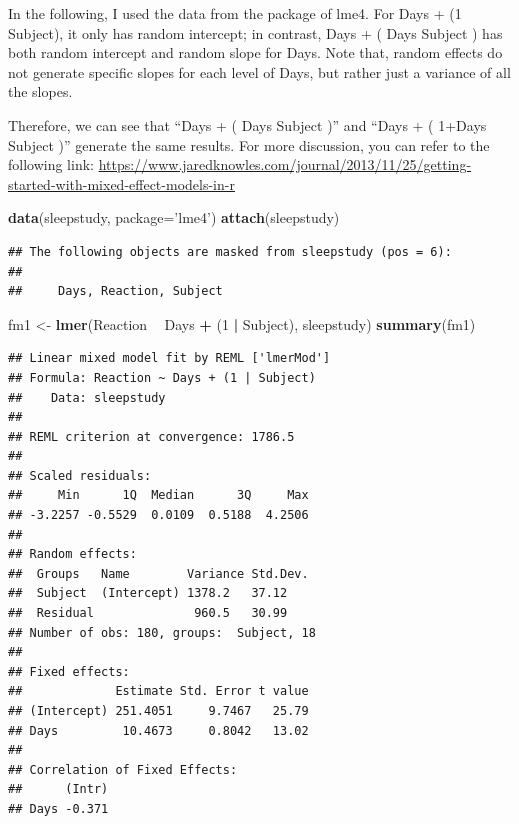 \documentclass[]{book}
\newenvironment{Shaded}{\begin{snugshade}}{\end{snugshade}}
\newcommand{\DataTypeTok}[1]{\textcolor[rgb]{0.13,0.29,0.53}{#1}}
\newcommand{\DecValTok}[1]{\textcolor[rgb]{0.00,0.00,0.81}{#1}}
\newcommand{\KeywordTok}[1]{\textcolor[rgb]{0.13,0.29,0.53}{\textbf{#1}}}
\newcommand{\NormalTok}[1]{#1}
\newcommand{\OperatorTok}[1]{\textcolor[rgb]{0.81,0.36,0.00}{\textbf{#1}}}
\newcommand{\StringTok}[1]{\textcolor[rgb]{0.31,0.60,0.02}{#1}}
\begin{document}
In the following, I used the data from the package of lme4. For Days + (1 \textbar{} Subject), it only has random intercept; in contrast, Days + ( Days\textbar{} Subject ) has both random intercept and random slope for Days. Note that, random effects do not generate specific slopes for each level of Days, but rather just a variance of all the slopes.

Therefore, we can see that ``Days + ( Days\textbar{} Subject )'' and ``Days + ( 1+Days\textbar{} Subject )'' generate the same results. For more discussion, you can refer to the following link: \url{https://www.jaredknowles.com/journal/2013/11/25/getting-started-with-mixed-effect-models-in-r}

\begin{Shaded}
\begin{Highlighting}[]
\KeywordTok{data}\NormalTok{(sleepstudy, }\DataTypeTok{package=}\StringTok{'lme4'}\NormalTok{)}
\KeywordTok{attach}\NormalTok{(sleepstudy)}
\end{Highlighting}
\end{Shaded}

\begin{verbatim}
## The following objects are masked from sleepstudy (pos = 6):
## 
##     Days, Reaction, Subject
\end{verbatim}

\begin{Shaded}
\begin{Highlighting}[]
\NormalTok{fm1 <-}\StringTok{ }\KeywordTok{lmer}\NormalTok{(Reaction }\OperatorTok{~}\StringTok{ }\NormalTok{Days }\OperatorTok{+}\StringTok{ }\NormalTok{(}\DecValTok{1} \OperatorTok{|}\StringTok{ }\NormalTok{Subject), sleepstudy)}
\KeywordTok{summary}\NormalTok{(fm1)}
\end{Highlighting}
\end{Shaded}

\begin{verbatim}
## Linear mixed model fit by REML ['lmerMod']
## Formula: Reaction ~ Days + (1 | Subject)
##    Data: sleepstudy
## 
## REML criterion at convergence: 1786.5
## 
## Scaled residuals: 
##     Min      1Q  Median      3Q     Max 
## -3.2257 -0.5529  0.0109  0.5188  4.2506 
## 
## Random effects:
##  Groups   Name        Variance Std.Dev.
##  Subject  (Intercept) 1378.2   37.12   
##  Residual              960.5   30.99   
## Number of obs: 180, groups:  Subject, 18
## 
## Fixed effects:
##             Estimate Std. Error t value
## (Intercept) 251.4051     9.7467   25.79
## Days         10.4673     0.8042   13.02
## 
## Correlation of Fixed Effects:
##      (Intr)
## Days -0.371
\end{verbatim}
\end{document}
